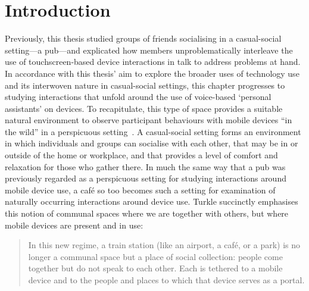 





\section{Introduction}\label{sec:empirical cafe introduction}
\begin{revisedsubmission}
Previously, this thesis studied groups of friends socialising in a casual-social setting---a pub---and explicated how members unproblematically interleave the use of touchscreen-based device interactions in talk to address problems at hand.
In accordance with this thesis' aim to explore the broader uses of technology use and its interwoven nature in casual-social settings, this chapter progresses to studying interactions that unfold around the use of voice-based `personal assistants' on devices.
To recapitulate, this type of space provides a suitable natural environment to observe participant behaviours with mobile devices ``in the wild'' in a perspicuous setting~\citep{Crabtree2006}.
A casual-social setting forms an environment in which individuals and groups can socialise with each other, that may be in or outside of the home or workplace, and that provides a level of comfort and relaxation for those who gather there.
In much the same way that a pub was previously regarded as a perspicuous setting for studying interactions around mobile device use, a caf\'{e} so too becomes such a setting for examination of naturally occurring interactions around device use.
Turkle succinctly emphasises this notion of communal spaces where we are together with others, but where mobile devices are present and in use:
\begin{quote}
    In this new regime, a train station (like an airport, a caf\'{e}, or a park) is no longer a communal space but a place of social collection: people come together but do not speak to each other. Each is tethered to a mobile device and to the people and places to which that device serves as a portal.

\end{quote}
\end{revisedsubmission}
